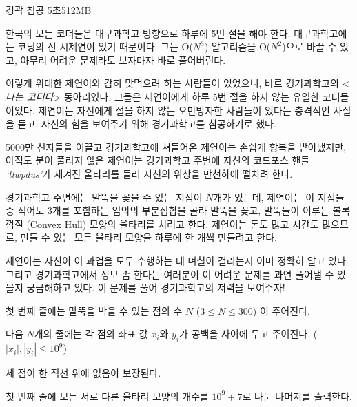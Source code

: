 \begin{problem}{경곽 침공}
{}{}
{5초}{512MB}{}

한국의 모든 코더들은 대구과학고 방향으로 하루에 5번 절을 해야 한다. 대구과학고에는 코딩의 신 시제연이 있기 때문이다. 그는 O($N^3$) 알고리즘을 O($N^2$)으로 바꿀 수 있고, 아무리 어려운 문제라도 보자마자 바로 풀어버린다.

이렇게 위대한 제연이와 감히 맞먹으려 하는 사람들이 있었으니, 바로 경기과학고의 <\textit{나는 코더다}> 동아리였다. 그들은 제연이에게 하루 5번 절을 하지 않는 유일한 코더들이었다. 제연이는 자신에게 절을 하지 않는 오만방자한 사람들이 있다는 충격적인 사실을 듣고, 자신의 힘을 보여주기 위해 경기과학고를 침공하기로 했다.

5000만 신자들을 이끌고 경기과학고에 쳐들어온 제연이는 손쉽게 항복을 받아냈지만, 아직도 분이 풀리지 않은 제연이는 경기과학고 주변에 자신의 코드포스 핸들 \textit{`tlwpdus'}가 새겨진 울타리를 둘러 자신의 위상을 만천하에 떨치려 한다.

경기과학고 주변에는 말뚝을 꽂을 수 있는 지점이 $N$개가 있는데, 제연이는 이 지점들 중 적어도 3개를 포함하는 임의의 부분집합을 골라 말뚝을 꽂고, 말뚝들이 이루는 볼록 껍질 (Convex Hull) 모양의 울타리를 치려고 한다. 제연이는 돈도 많고 시간도 많으므로, 만들 수 있는 모든 울타리 모양을 하루에 한 개씩 만들려고 한다.

제연이는 자신이 이 과업을 모두 수행하는 데 며칠이 걸리는지 이미 정확히 알고 있다. 그리고 경기과학고에서 정보 좀 한다는 여러분이 이 어려운 문제를 과연 풀어낼 수 있을지 궁금해하고 있다. 이 문제를 풀어 경기과학고의 저력을 보여주자!

\InputFile

첫 번째 줄에는 말뚝을 박을 수 있는 점의 수 $N$ ($3 \le N \le 300$) 이 주어진다.

다음 $N$개의 줄에는 각 점의 좌표 값 $x_i$와 $y_i$가 공백을 사이에 두고 주어진다. ($|x_i|, |y_i| \le 10^9$)

세 점이 한 직선 위에 없음이 보장된다.

\OutputFile

첫 번째 줄에 모든 서로 다른 울타리 모양의 개수를 $10^9+7$로 나눈 나머지를 출력한다.

\Examples
	
\begin{example}
%
\end{example} 

\blankpage

\end{problem}
